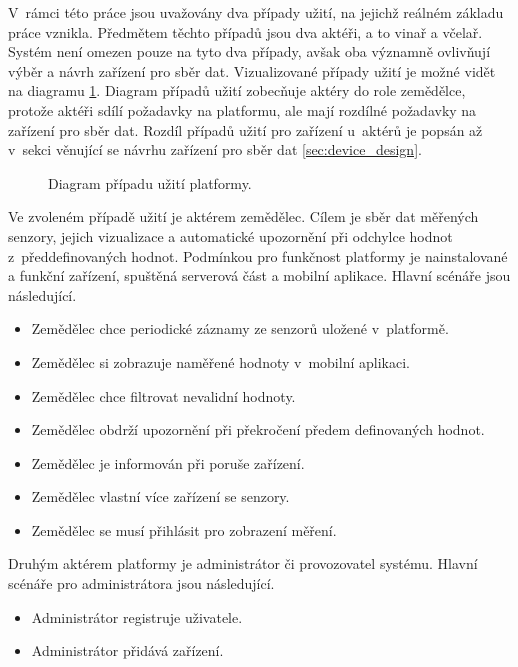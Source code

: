 \label{sec:sys_use_case}
V~rámci této práce jsou uvažovány dva případy užití, na jejichž reálném základu práce vznikla. Předmětem těchto případů jsou dva aktéři, a to vinař a včelař. Systém není omezen pouze na tyto dva případy, avšak oba významně ovlivňují výběr a návrh zařízení pro sběr dat. Vizualizované případy užití je možné vidět na diagramu \ref{diag:use_case}. Diagram případů užití zobecňuje aktéry do role zemědělce, protože aktéři sdílí požadavky na platformu, ale mají rozdílné požadavky na zařízení pro sběr dat. Rozdíl případů užití pro zařízení u~aktérů je popsán až v~sekci věnující se návrhu zařízení pro sběr dat \ref{sec:device_design}.

\begin{figure}[ht]
  \centering
  
  \caption{Diagram případu užití platformy.}
  \label{diag:use_case}
\end{figure}

Ve zvoleném případě užití je aktérem zemědělec. Cílem je sběr dat měřených senzory, jejich vizualizace a automatické upozornění při odchylce hodnot z~předdefinovaných hodnot. Podmínkou pro funkčnost platformy je nainstalované a funkční zařízení, spuštěná serverová část a mobilní aplikace. Hlavní scénáře jsou následující.
\begin{itemize}
    \item Zemědělec chce periodické záznamy ze senzorů uložené v~platformě.
    \item Zemědělec si zobrazuje naměřené hodnoty v~mobilní aplikaci.
    \item Zemědělec chce filtrovat nevalidní hodnoty.
    \item Zemědělec obdrží upozornění při překročení předem definovaných hodnot.
    \item Zemědělec je informován při poruše zařízení.
    \item Zemědělec vlastní více zařízení se senzory.
    \item Zemědělec se musí přihlásit pro zobrazení měření.
\end{itemize}

Druhým aktérem platformy je administrátor či provozovatel systému. Hlavní scénáře pro administrátora jsou následující.
\begin{itemize}
    \item Administrátor registruje uživatele.
    \item Administrátor přidává zařízení.
\end{itemize}

